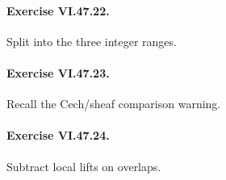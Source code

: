 \paragraph{Exercise VI.47.22.}
\begin{hint}
Split into the three integer ranges.
\end{hint}

\paragraph{Exercise VI.47.23.}
\begin{hint}
Recall the Cech/sheaf comparison warning.
\end{hint}

\paragraph{Exercise VI.47.24.}
\begin{hint}
Subtract local lifts on overlaps.
\end{hint}
